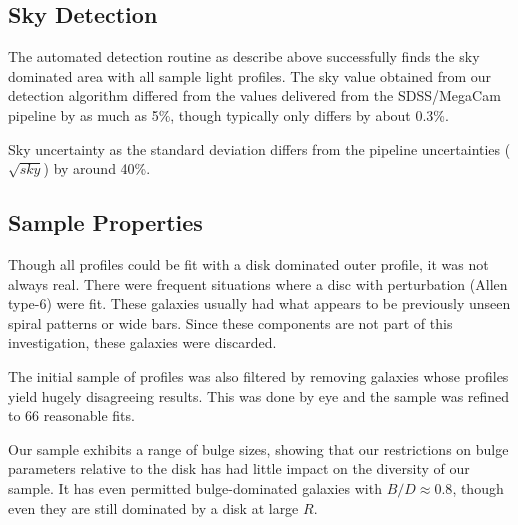 


\subsection{Sky Detection} %
\label{sub:sky_detection}
The automated detection routine as describe above successfully finds the sky dominated area with all sample light profiles. The sky value obtained from our detection algorithm differed from the values delivered from the SDSS/MegaCam pipeline by as much as 5\%, though typically only differs by about 0.3\%. 
\begin{figure}
\end{figure}
Sky uncertainty as the standard deviation differs from the pipeline uncertainties ($\sqrt{sky}$) by around 40\%. 


\subsection{Sample Properties}
Though all profiles could be fit with a disk dominated outer profile, it was not always real. There were frequent situations where a disc with perturbation (Allen type-6) were fit. These galaxies usually had what appears to be previously unseen spiral patterns or wide bars. Since these components are not part of this investigation, these galaxies were discarded.

The initial sample of profiles was also filtered by removing galaxies whose profiles yield hugely disagreeing results. This was done by eye and the sample was refined to 66 reasonable fits. 

Our sample exhibits a range of bulge sizes, showing that our restrictions on bulge parameters relative to the disk has had little impact on the diversity of our sample. It has even permitted bulge-dominated galaxies with $B/D \approx 0.8$, though even they are still dominated by a disk at large $R$.

\begin{figure}
\end{figure}



